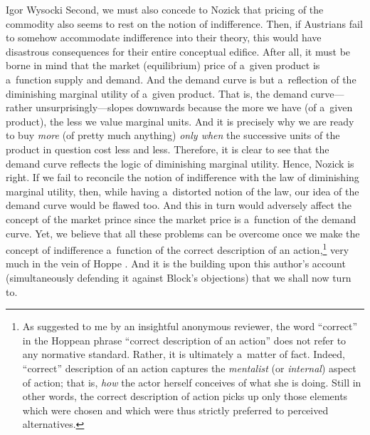 \begin{artengenv}{Igor Wysocki}
Second, we must also concede to Nozick that pricing of the commodity also seems to rest on the notion of indifference. Then, if Austrians fail to somehow accommodate indifference into their theory, this would have disastrous consequences for their entire conceptual edifice. After all, it must be borne in mind that the market (equilibrium) price of a~given product is a~function supply and demand. And the demand curve is but a~reflection of the diminishing marginal utility of a~given product. That is, the demand curve---rather unsurprisingly---slopes downwards because the more we have (of a~given product), the less we value marginal units. And it is precisely why we are ready to buy \textit{more} (of pretty much anything) \textit{only when} the successive units of the product in question cost less and less. Therefore, it is clear to see that the demand curve reflects the logic of diminishing marginal utility. Hence, Nozick is right. If we fail to reconcile the notion of indifference with the law of diminishing marginal utility, then, while having a~distorted notion of the law, our idea of the demand curve would be flawed too. And this in turn would adversely affect the concept of the market prince since the market price is a~function of the demand curve. Yet, we believe that all these problems can be overcome once we make the concept of indifference a~function of the correct description of an action,\footnote{As suggested to me by an insightful anonymous reviewer, the word ``correct'' in the Hoppean
\parencite*[][]{hoppe_must_2005} %
 phrase ``correct description of an action'' does not refer to any normative standard. Rather, it is ultimately a~matter of fact. Indeed, ``correct'' description of an action captures the \textit{mentalist} (or \textit{internal}) aspect of action; that is, \textit{how} the actor herself conceives of what she is doing. Still in other words, the correct description of action picks up only those elements which were chosen and which were thus strictly preferred to perceived alternatives.} very much in the vein of Hoppe 
\parencite*[][]{hoppe_must_2005}. %
 And it is the building upon this author's account (simultaneously defending it against Block's objections) that we shall now turn to.


\end{artengenv}
